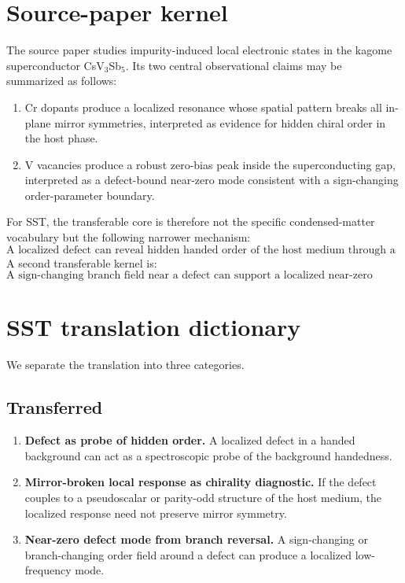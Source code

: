\documentclass[11pt]{article}
\begin{document}
    \section{Source-paper kernel}
        The source paper studies impurity-induced local electronic states in the kagome superconductor CsV$_3$Sb$_5$. Its two central observational claims may be summarized as follows:
        \begin{enumerate}[label=(\alph*)]
    \item Cr dopants produce a localized resonance whose spatial pattern breaks all in-plane mirror symmetries, interpreted as evidence for hidden chiral order in the host phase.
    \item V vacancies produce a robust zero-bias peak inside the superconducting gap, interpreted as a defect-bound near-zero mode consistent with a sign-changing order-parameter boundary.
        \end{enumerate}

        For SST, the transferable core is therefore not the specific condensed-matter vocabulary but the following narrower mechanism:
        \begin{equation}
            \boxed{
                \text{A localized defect can reveal hidden handed order of the host medium through a symmetry-broken localized response.}
            }
        \end{equation}
        A second transferable kernel is:
        \begin{equation}
            \boxed{
                \text{A sign-changing branch field near a defect can support a localized near-zero mode.}
            }
        \end{equation}

    \section{SST translation dictionary}
        We separate the translation into three categories.

        \subsection{Transferred}
            \begin{enumerate}[label=\arabic*.]
    \item \textbf{Defect as probe of hidden order.} A localized defect in a handed background can act as a spectroscopic probe of the background handedness.
    \item \textbf{Mirror-broken local response as chirality diagnostic.} If the defect couples to a pseudoscalar or parity-odd structure of the host medium, the localized response need not preserve mirror symmetry.
    \item \textbf{Near-zero defect mode from branch reversal.} A sign-changing or branch-changing order field around a defect can produce a localized low-frequency mode.
            \end{enumerate}
\end{document}
